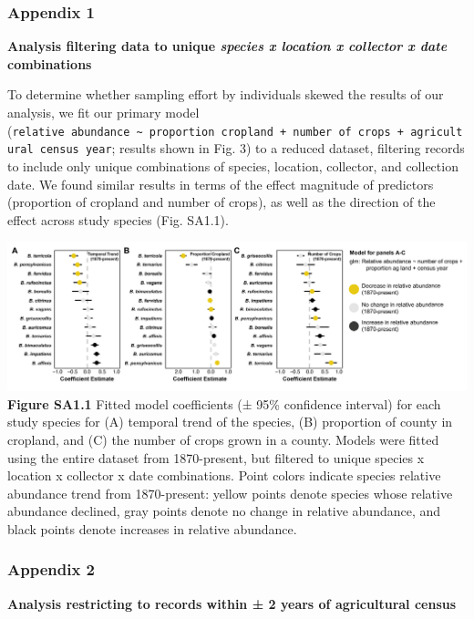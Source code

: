 \documentclass[11pt,]{article}
\begin{document}
\hypertarget{appendix-1}{%
\subsubsection{Appendix 1}\label{appendix-1}}

\textbf{Analysis filtering data to unique \emph{species x location x
collector x date} combinations}

To determine whether sampling effort by individuals skewed the results
of our analysis, we fit our primary model
(\texttt{relative\ abundance\ \textasciitilde{}\ proportion\ cropland\ +\ number\ of\ crops\ +\ agricultural\ census\ year};
results shown in Fig. 3) to a reduced dataset, filtering records to
include only unique combinations of species, location, collector, and
collection date. We found similar results in terms of the effect
magnitude of predictors (proportion of cropland and number of crops), as
well as the direction of the effect across study species (Fig. SA1.1).

\includegraphics[width=1\textwidth,height=\textheight]{../ms_figs/appendix1.png}
\textbf{Figure SA1.1} Fitted model coefficients (± 95\% confidence
interval) for each study species for (A) temporal trend of the species,
(B) proportion of county in cropland, and (C) the number of crops grown
in a county. Models were fitted using the entire dataset from
1870-present, but filtered to unique species x location x collector x
date combinations. Point colors indicate species relative abundance
trend from 1870-present: yellow points denote species whose relative
abundance declined, gray points denote no change in relative abundance,
and black points denote increases in relative abundance.

\clearpage

\newpage

\hypertarget{appendix-2}{%
\subsubsection{Appendix 2}\label{appendix-2}}

\textbf{Analysis restricting to records within ± 2 years of agricultural
census}
\end{document}
